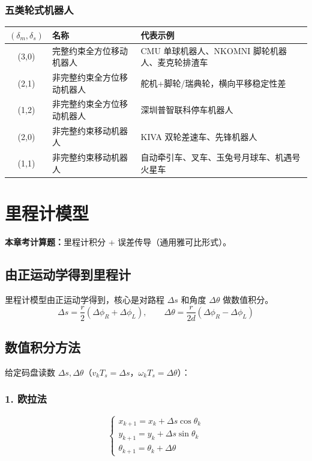\documentclass[11pt,a4paper]{article}
\begin{document}
\subsubsection{五类轮式机器人}
\begin{center}
\begin{tabular}{c|p{3.5cm}|p{6cm}}
\toprule
$(\delta_m,\delta_s)$ & 名称 & 代表示例 \\
\midrule
(3,0) & 完整约束全方位移动机器人 & CMU 单球机器人、NKOMNI 脚轮机器人、麦克轮排渣车 \\
(2,1) & 非完整约束全方位移动机器人 & 舵机+脚轮/瑞典轮，横向平移稳定性差 \\
(1,2) & 非完整约束全方位移动机器人 & 深圳普智联科停车机器人 \\
(2,0) & 非完整约束移动机器人 & KIVA 双轮差速车、先锋机器人 \\
(1,1) & 非完整约束移动机器人 & 自动牵引车、叉车、玉兔号月球车、机遇号火星车 \\
\bottomrule
\end{tabular}
\end{center}

\section{里程计模型}

\begin{keypoint}
\textbf{本章考计算题：}里程计积分 + 误差传导（通用雅可比形式）。
\end{keypoint}

\subsection{由正运动学得到里程计}

里程计模型由正运动学得到，核心是对路程 $\Delta s$ 和角度 $\Delta\theta$ 做数值积分。
\[
\Delta s = \frac{r}{2}(\Delta\phi_R+\Delta\phi_L),\qquad
\Delta\theta = \frac{r}{2d}(\Delta\phi_R-\Delta\phi_L)
\]

\subsection{数值积分方法}

给定码盘读数 $\Delta s,\Delta\theta$（$v_k T_s=\Delta s$，$\omega_k T_s=\Delta\theta$）：

\subsubsection*{1. 欧拉法}
\[
\begin{cases}
x_{k+1}=x_k+\Delta s\cos\theta_k\\
y_{k+1}=y_k+\Delta s\sin\theta_k\\
\theta_{k+1}=\theta_k+\Delta\theta
\end{cases}
\]
\end{document}
